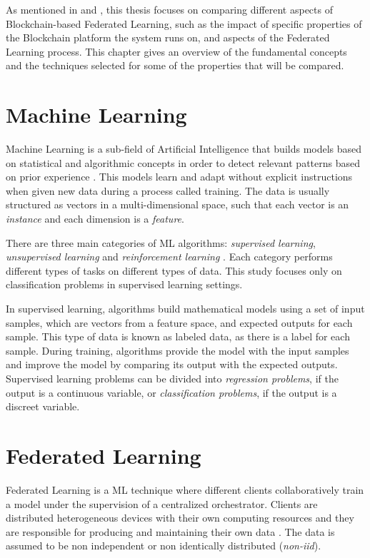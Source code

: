 As mentioned in  and , this thesis focuses on comparing different aspects of Blockchain-based Federated Learning, such as the impact of specific properties of the Blockchain platform the system runs on, and aspects of the Federated Learning process. This chapter gives an overview of the fundamental concepts and the techniques selected for some of the properties that will be compared.

\section{Machine Learning}\label{background:machine_learning}

Machine Learning is a sub-field of Artificial Intelligence that builds models based on statistical and algorithmic concepts in order to detect relevant patterns based on prior experience \cite{geron_2019}. This models learn and adapt without explicit instructions when given new data during a process called training. The data is usually structured as vectors in a multi-dimensional space, such that each vector is an \textit{instance} and each dimension is a \textit{feature}.

There are three main categories of ML algorithms: \textit{supervised learning}, \textit{unsupervised learning} and \textit{reinforcement learning} \cite{geron_2019}. Each category performs different types of tasks on different types of data. This study focuses only on classification problems in supervised learning settings.

In supervised learning, algorithms build mathematical models using a set of input samples, which are vectors from a feature space, and expected outputs for each sample. This type of data is known as labeled data, as there is a label for each sample. During training, algorithms provide the model with the input samples and improve the model by comparing its output with the expected outputs. Supervised learning problems can be divided into \textit{regression problems}, if the output is a continuous variable, or \textit{classification problems}, if the output is a discreet variable.

\section{Federated Learning}\label{background:federated_learning}

Federated Learning is a ML technique where different clients collaboratively train a model under the supervision of a centralized orchestrator. Clients are distributed heterogeneous devices with their own computing resources and they are responsible for producing and maintaining their own data \cite{9084352}. The data is assumed to be non independent or non identically distributed (\textit{non-iid}).

